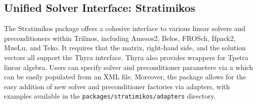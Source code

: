 \subsection{Unified Solver Interface: Stratimikos}
\label{sec:Stratimikos}
The Stratimikos package offers a cohesive interface to various linear solvers and preconditioners within Trilinos, including Amesos2, Belos, FROSch, Ifpack2, MueLu, and Teko.
It requires that the matrix, right-hand side, and the solution vectors all support the Thyra interface.
Thyra also provides wrappers for Tpetra linear algebra.
Users can specify solver and preconditioner parameters via a 
which can be easily populated from an XML file.
Moreover, the package allows for the easy addition of new solver and preconditioner factories via adapters, with examples available in the \texttt{packages/stratimikos/adapters} directory.
